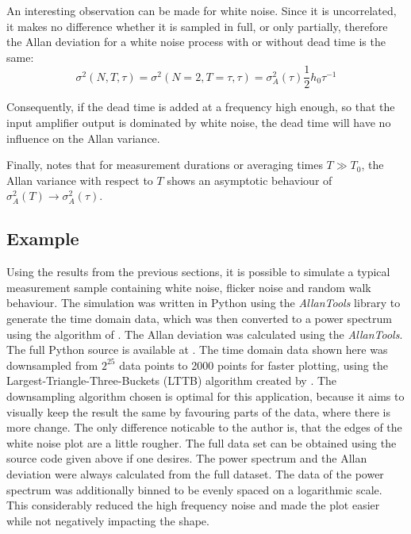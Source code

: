 An interesting observation can be made for white noise. Since it is uncorrelated, it makes no difference whether it is sampled in full, or only partially, therefore the Allan deviation for a white noise process with or without dead time is the same:
\begin{equation}
    \sigma^2(N,T, \tau) = \sigma^2(N=2,T=\tau, \tau) = \sigma_A^2(\tau) \frac 1 2 h_0 \tau^{-1}
\end{equation}

Consequently, if the dead time is added at a frequency high enough, so that the input amplifier output is dominated by white noise, the dead time will have no influence on the Allan variance.

Finally, \citeauthor{psd_to_adev} \cite{psd_to_adev} notes that for measurement durations or averaging times $T \gg T_0$, the Allan variance with respect to $T$ shows an asymptotic behaviour of $\sigma_A^2(T) \to \sigma_A^2(\tau)$.

\clearpage
\subsection{Example}
\label{sec:noise_example}
Using the results from the previous sections, it is possible to simulate a typical measurement sample containing white noise, flicker noise and random walk behaviour. The simulation was written in Python using the \textit{AllanTools} library \cite{allantools} to generate the time domain data, which was then converted to a power spectrum using the algorithm of \citeauthor{welch} \cite{welch}. The Allan deviation was calculated using the \textit{AllanTools}. The full Python source is available at \cite{}. The time domain data shown here was downsampled from $2^{25}$ data points to \num{2000} points for faster plotting, using the Largest-Triangle-Three-Buckets (LTTB) algorithm created by \citeauthor{lttb} \cite{lttb}. The downsampling algorithm chosen is optimal for this application, because it aims to visually keep the result the same by favouring parts of the data, where there is more change. The only difference noticable to the author is, that the edges of the white noise plot are a little rougher. The full data set can be obtained using the source code given above if one desires. The power spectrum and the Allan deviation were always calculated from the full dataset. The data of the power spectrum was additionally binned to be evenly spaced on a logarithmic scale. This considerably reduced the high frequency noise and made the plot easier while not negatively impacting the shape.

